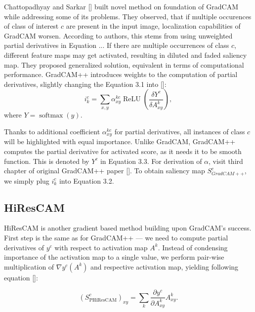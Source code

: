 \noindent
Chattopadhyay and Sarkar [] built novel method on foundation of GradCAM while addressing some of its problems. They observed, that if multiple occurences of class of interest $c$ are present in the input image, localization capabilities of GradCAM worsen. According to authors, this stems from using unweighted partial derivatives in Equation ... If there are multiple occurrences of class $c$, different feature maps may get activated, resulting in diluted and faded saliency map. They proposed generalized solution, equivalent in terms of computational performance. GradCAM++ introduces weights to the computation of partial derivatives, slightly changing the Equation 3.1 into []:
\begin{equation}
    i^c_k = \sum_{x,y} \alpha^{kc}_{xy} \operatorname{ReLU}(\frac{\delta Y^c}{\delta A^k_{xy}}),
\end{equation}
where $Y = \operatorname{softmax}(y)$.

Thanks to additional coefficient $\alpha^{kc}_{xy}$ for partial derivatives, all instances of class $c$ will be highlighted with equal importance. Unlike GradCAM, GradCAM++ computes the partial derivative for activated score, as it needs it to be smooth function. This is denoted by $Y^c$ in Equation 3.3. For derivation of $\alpha$, visit third chapter of original GradCAM++ paper []. To obtain saliency map $S^c_{GradCAM++}$, we simply plug $i^c_k$ into Equation 3.2.


\subsection{HiResCAM}

HiResCAM is another gradient based method building upon GradCAM's success. First step is the same as for GradCAM++ --- we need to compute partial derivatives of $y^c$ with respect to activation map $A^k$. Instead of condensing importance of the activation map to a single value, we perform pair-wise multiplication of $\nabla y^c(A^k)$ and respective activation map, yielding following equation []: 

\begin{equation}
    (S^c_{\text{PHiResCAM}})_{xy}
        = \sum_k \frac{\partial y^c}{\partial A^k_{xy}} A^k_{xy}.
\end{equation}

